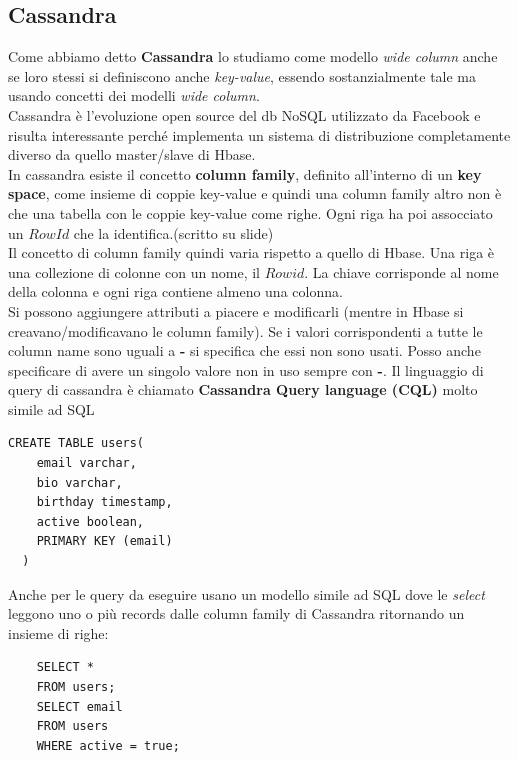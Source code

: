 \subsection{Cassandra}
Come abbiamo detto \textbf{Cassandra} lo studiamo come modello \textit{wide column} anche se loro stessi si definiscono anche \textit{key-value}, essendo sostanzialmente tale ma usando concetti dei modelli \textit{wide column}.\\ Cassandra è l'evoluzione open source del db NoSQL utilizzato da Facebook e risulta interessante perché implementa un sistema di distribuzione completamente diverso da quello master/slave di Hbase.\\ In cassandra esiste il concetto \textbf{column family}, definito all'interno di un \textbf{key space}, come insieme di coppie key-value e quindi una column family altro non è che una tabella con le coppie key-value come righe. Ogni riga ha poi assocciato un $Row Id$ che la identifica.(scritto su slide)\\ Il concetto di column family quindi varia rispetto a quello di Hbase. Una riga è una collezione di colonne con un nome, il $Row id$. La chiave corrisponde al nome della colonna e ogni riga contiene almeno una colonna.\\

Si possono aggiungere attributi a piacere e modificarli (mentre in Hbase si creavano/modificavano le column family). Se i valori corrispondenti a tutte le column name sono uguali a \textbf{-} si specifica che essi non sono usati. Posso anche specificare di avere un singolo valore non in uso sempre con \textbf{-}. Il linguaggio di query di cassandra è chiamato \textbf{Cassandra Query language (CQL)} molto simile ad SQL
\begin{lstlisting}[caption = creazione molto simile al linguaggio SQL si usano infatti gli stessi costruttori]
  CREATE TABLE users(
    email varchar,
    bio varchar,
    birthday timestamp,
    active boolean,
    PRIMARY KEY (email)
  )
\end{lstlisting}
Anche per le query da eseguire usano un modello simile ad SQL dove le \textit{select} leggono uno o più records dalle column family di Cassandra ritornando un insieme di righe: 
\begin{lstlisting}
    SELECT * 
    FROM users; 
    SELECT email 
    FROM users 
    WHERE active = true; 
\end{lstlisting}

